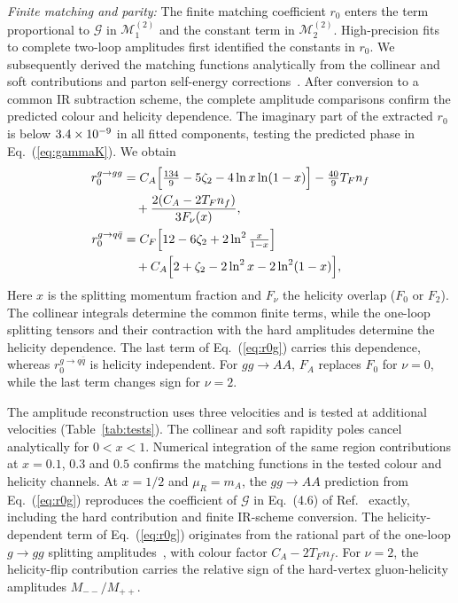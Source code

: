\documentclass[%
 twocolumn,
 superscriptaddress,
 preprintnumbers,
 nofootinbib,
 amsmath,amssymb,
 aps,
 prl,
]{revtex4-2}
\newcommand{\G}{\mathcal G}
\newcommand{\M}{\mathcal M}
\begin{document}
\textit{Finite matching and parity:}
The finite matching coefficient $r_0$ enters
the term proportional to $\mathcal G$ in
$\M_1^{(2)}$ and the constant term in
$\M_2^{(2)}$. High-precision fits to complete
two-loop amplitudes first identified the constants in $r_0$.
We subsequently derived the matching functions
analytically from the collinear and soft contributions
and parton self-energy corrections~\cite{SM}.
After conversion to a common IR subtraction scheme,
the complete amplitude comparisons confirm the
predicted colour and helicity dependence.
The imaginary part of the extracted $r_0$ is below
$3.4\times10^{-9}$ in all \glauberValues{} fitted components,
testing the predicted phase in Eq.~(\ref{eq:gammaK}).
We obtain
\begin{align}
r_0^{g\to gg}&=C_A\Big[\tfrac{134}9-5\zeta_2-4\ln x\ln(1-x)\Big]-\tfrac{40}9T_Fn_f\notag\\
&\quad+\frac{2(C_A-2T_Fn_f)}{3F_\nu(x)},\label{eq:r0g}\\
r_0^{g\to q\bar q}&=C_F\Big[12-6\zeta_2+2\ln^2\tfrac{x}{1-x}\Big]\notag\\
&\quad+C_A\Big[2+\zeta_2-2\ln^2x-2\ln^2(1-x)\Big],\label{eq:r0q}
\end{align}
Here $x$ is the splitting momentum fraction and $F_\nu$
the helicity overlap ($F_0$ or $F_2$).
The collinear integrals determine the common finite terms,
while the one-loop splitting tensors and their contraction
with the hard amplitudes determine the helicity dependence.
The last term of Eq.~(\ref{eq:r0g}) carries this dependence,
whereas $r_0^{g\to q\bar q}$ is helicity independent.
For $gg\to AA$, $F_A$ replaces $F_0$ for $\nu=0$,
while the last term changes sign for $\nu=2$.

The amplitude reconstruction uses three velocities
and is tested at additional velocities
(Table~\ref{tab:tests}).
The collinear and soft rapidity poles cancel analytically
for $0<x<1$. Numerical integration of the same
region contributions at $x=0.1$, $0.3$ and $0.5$
confirms the matching functions in the tested colour
and helicity channels.
At $x=1/2$ and $\mu_R=m_A$, the $gg\to AA$ prediction
from Eq.~(\ref{eq:r0g}) reproduces the coefficient of
$\G$ in Eq.~(4.6) of Ref.~\cite{P1} exactly, including
the hard contribution and finite IR-scheme conversion.
The helicity-dependent term of Eq.~(\ref{eq:r0g}) originates from the
rational part of the one-loop $g\to gg$ splitting amplitudes~\cite{Bern:1999ry}, with colour factor $C_A-2T_Fn_f$.
For $\nu=2$, the helicity-flip contribution carries the
relative sign of the hard-vertex gluon-helicity amplitudes
$M_{--}/M_{++}$.
\end{document}

